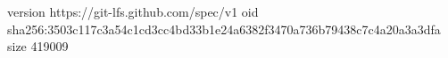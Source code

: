 version https://git-lfs.github.com/spec/v1
oid sha256:3503c117c3a54c1cd3cc4bd33b1e24a6382f3470a736b79438c7c4a20a3a3dfa
size 419009

